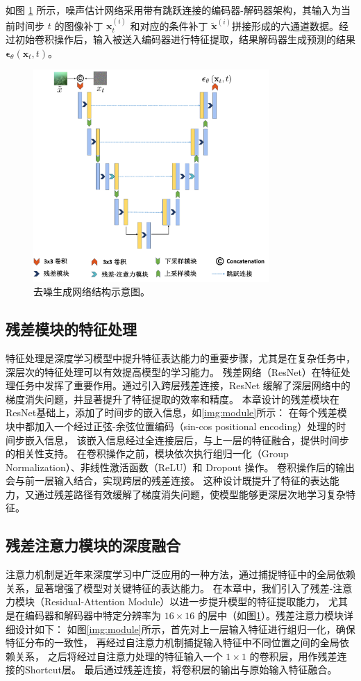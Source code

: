 如图 \ref{img:network} 所示，噪声估计网络采用带有跳跃连接的编码器-解码器架构，其输入为当前时间步 $t$ 的图像补丁 $\mathbf{x}^{(i)}_t$ 和对应的条件补丁 $\tilde{\mathbf{x}}^{(i)}$拼接形成的六通道数据。经过初始卷积操作后，输入被送入编码器进行特征提取，结果解码器生成预测的结果$\boldsymbol{\epsilon}_\theta(\mathbf{x}_t, t)$。
\begin{figure}[ht]
    \centering 
    \includegraphics[width=0.8\textwidth]{figures/ch3/network.pdf}
    \caption{去噪生成网络结构示意图。}
    \label{img:network}
\end{figure}

\subsection{残差模块的特征处理}
特征处理是深度学习模型中提升特征表达能力的重要步骤，尤其是在复杂任务中，深层次的特征处理可以有效提高模型的学习能力。
残差网络（ResNet）\cite{resnet}在特征处理任务中发挥了重要作用。通过引入跨层残差连接，ResNet 缓解了深层网络中的梯度消失问题，并显著提升了特征提取的效率和精度。
本章设计的残差模块在ResNet基础上，添加了时间步的嵌入信息，如\ref{img:module}所示：
在每个残差模块中都加入一个经过正弦-余弦位置编码（sin-cos positional encoding）处理的时间步嵌入信息，
该嵌入信息经过全连接层后，与上一层的特征融合，提供时间步的相关性支持。
在卷积操作之前，模块依次执行组归一化（Group Normalization）、非线性激活函数（ReLU）和 Dropout 操作。
卷积操作后的输出会与前一层输入结合，实现跨层的残差连接。
这种设计既提升了特征的表达能力，又通过残差路径有效缓解了梯度消失问题，使模型能够更深层次地学习复杂特征。

\subsection{残差注意力模块的深度融合}
注意力机制是近年来深度学习中广泛应用的一种方法，通过捕捉特征中的全局依赖关系，显著增强了模型对关键特征的表达能力。
在本章中，我们引入了残差-注意力模块（Residual-Attention Module）以进一步提升模型的特征提取能力，
尤其是在编码器和解码器中特定分辨率为 $16 \times 16$ 的层中（如图\ref{img:network}）。残差注意力模块详细设计如下：
如图\ref{img:module}所示，首先对上一层输入特征进行组归一化，确保特征分布的一致性，
再经过自注意力机制捕捉输入特征中不同位置之间的全局依赖关系，
之后将经过自注意力处理的特征输入一个 $1 \times 1$ 的卷积层，用作残差连接的Shortcut层。
最后通过残差连接，将卷积层的输出与原始输入特征融合。

